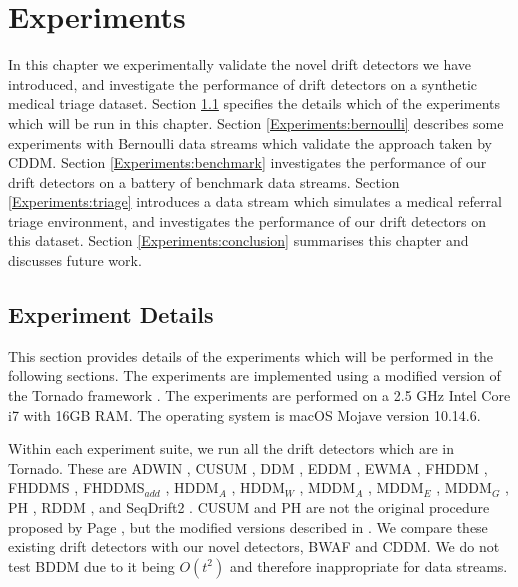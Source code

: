 \chapter{Experiments} \label{chapt:Experiments}

In this chapter we experimentally validate the novel drift detectors we have introduced, and investigate the performance of drift detectors on a synthetic medical triage dataset. Section \ref{Experiments:details} specifies the details which of the experiments which will be run in this chapter. Section \ref{Experiments:bernoulli} describes some experiments with Bernoulli data streams which validate the approach taken by CDDM. Section \ref{Experiments:benchmark} investigates the performance of our drift detectors on a battery of benchmark data streams. Section \ref{Experiments:triage} introduces a data stream which simulates a medical referral triage environment, and investigates the performance of our drift detectors on this dataset. Section \ref{Experiments:conclusion} summarises this chapter and discusses future work.


\section{Experiment Details} \label{Experiments:details}

This section provides details of the experiments which will be performed in the following sections. The experiments are implemented using a modified version of the Tornado framework \cite{tornado}. The experiments are performed on a 2.5 GHz Intel Core i7 with 16GB RAM. The operating system is macOS Mojave version 10.14.6. 

Within each experiment suite, we run all the drift detectors which are in Tornado. These are ADWIN \cite{ADWIN}, CUSUM \cite{CUSUM}, DDM \cite{DDM}, EDDM \cite{EDDM}, EWMA \cite{EWMA}, FHDDM \cite{FHDDM}, FHDDMS \cite{FHDDM}, FHDDMS$_{add}$ \cite{FHDDM}, HDDM$_A$ \cite{HDDM}, HDDM$_W$ \cite{HDDM}, MDDM$_A$ \cite{HDDM}, MDDM$_E$ \cite{MDDM}, MDDM$_G$ \cite{MDDM}, PH \cite{CUSUM}, RDDM \cite{RDDM}, and SeqDrift2 \cite{seq_drift}. CUSUM and PH are not the original procedure proposed by Page \cite{CUSUM}, but the modified versions described in \cite{gama_survey}. We compare these existing drift detectors with our novel detectors, BWAF and CDDM. We do not test BDDM due to it being $O(t^2)$ and therefore inappropriate for data streams.

